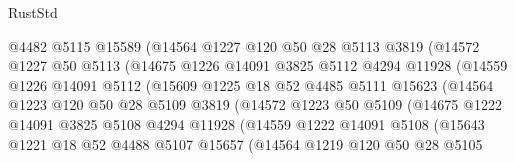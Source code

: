 \begin{lexlean}{RustStd}
\begin{coremodule}
                      @4482
                      @5115
                      @15589
                      (@14564
                        @1227
                        @120
                        @50
                        @28
                        @5113
                        @3819
                        (@14572
                          @1227
                          @50
                          @5113
                          (@14675
                            @1226
                            @14091
                            @3825
                            @5112
                            @4294
                            @11928
                            (@14559
                              @1226
                              @14091
                              @5112
                              (@15609
                                @1225
                                @18
                                @52
                                @4485
                                @5111
                                @15623
                                (@14564
                                  @1223
                                  @120
                                  @50
                                  @28
                                  @5109
                                  @3819
                                  (@14572
                                    @1223
                                    @50
                                    @5109
                                    (@14675
                                      @1222
                                      @14091
                                      @3825
                                      @5108
                                      @4294
                                      @11928
                                      (@14559
                                        @1222
                                        @14091
                                        @5108
                                        (@15643
                                          @1221
                                          @18
                                          @52
                                          @4488
                                          @5107
                                          @15657
                                          (@14564
                                            @1219
                                            @120
                                            @50
                                            @28
                                            @5105

\end{coremodule}
\end{lexlean}
